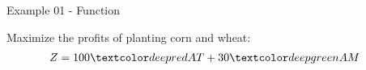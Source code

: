 \begin{frame}{Example 01 - Function}

Maximize the profits of planting corn and wheat:
\Huge{
\begin{align*}
    Z &= 100\colora{AT} + 30\colorb{AM}
\end{align*}
}

\end{frame}
